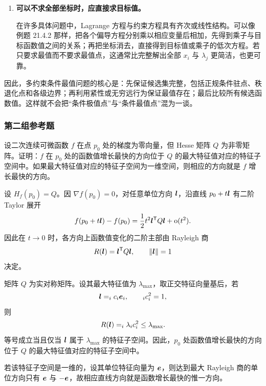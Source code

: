 \begin{xsolution}
\begin{enumerate}[label=\arabic*.]
  \item \textbf{可以不求全部坐标时，应直接求目标值。}

  在许多具体问题中，Lagrange 方程与约束方程具有齐次或线性结构。可以像例题 21.4.2 那样，把各个偏导方程分别乘以相应变量后相加，先得到乘子与目标函数值之间的关系；再把坐标消去，直接得到目标值或乘子的低次方程。若只要求最值而不要求最值点，这通常比完整解出全部 $x_i$ 与 $\lambda_j$ 更简洁，也更可靠。
\end{enumerate}

因此，多约束条件最值问题的核心是：先保证候选集完整，包括正规条件驻点、秩退化点和各级边界；再利用紧性或无穷远行为保证最值存在；最后比较所有候选函数值。这样就不会把“条件极值点”与“条件最值点”混为一谈。
\end{xsolution}


\subsubsection*{第二组参考题}
\begin{xreferenceproblem}[1]
设二次连续可微函数 $f$ 在点 $p_0$ 处的梯度为零向量，但 Hesse 矩阵 $Q$ 为非零矩阵。证明：$f$ 在 $p_0$ 处的函数值增长最快的方向位于 $Q$ 的最大特征值对应的特征子空间中。如果最大特征值对应的特征子空间为一维空间，则相应的方向就是 $f$ 增长最快的方向。
\end{xreferenceproblem}
\begin{xsolution}
设 $H_f(p_0)=Q$。因 $\nabla f(p_0)=0$，对任意单位方向 $\bm{l}$，沿直线 $p_0+t\bm{l}$ 有二阶 Taylor 展开
\[
  f(p_0+t\bm{l})-f(p_0)
  =\frac12t^2\bm{l}^{\mathsf T}Q\bm{l}+\mathrm{o}(t^2).
\]
因此在 $t\to0$ 时，各方向上函数值变化的二阶主部由 Rayleigh 商
\[
  R(\bm{l})=\bm{l}^{\mathsf T}Q\bm{l},
  \qquad \lVert\bm{l}\rVert=1
\]
决定。

矩阵 $Q$ 为实对称矩阵。设其最大特征值为 $\lambda_{\max}$，取正交特征向量基后，若
\[
  \bm{l}=\relax_i c_i\bm{e}_i,
  \qquad
  \relax_i c_i^2=1,
\]
则
\[
  R(\bm{l})=\relax_i\lambda_i c_i^2\le\lambda_{\max}.
\]
等号成立当且仅当 $\bm{l}$ 属于 $\lambda_{\max}$ 的特征子空间。因此，$p_0$ 处函数值增长最快的方向位于 $Q$ 的最大特征值对应的特征子空间中。

若该特征子空间是一维的，设其单位特征向量为 $\bm{e}$，则达到最大 Rayleigh 商的单位方向只有 $\bm{e}$ 与 $-\bm{e}$，故相应直线方向就是函数增长最快的惟一方向。
\end{xsolution}


